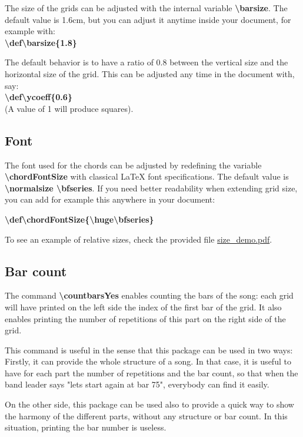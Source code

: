 \documentclass[11pt]{article}
\newcommand{\btt}{\bfseries \ttfamily }
\newcommand{\tbs}{\textbackslash{}}
\begin{document}
The size of the grids can be adjusted with the internal variable 
{\btt \tbs barsize}.
The default value is 1.6cm, but you can adjust it anytime inside your document, for example with:\\
{\btt \tbs def\tbs barsize\{1.8\}}

The default behavior is to have a ratio of 0.8 between the vertical size and the horizontal size of the grid.
This can be adjusted any time in the document with, say: \\
{\btt \tbs def\tbs ycoeff\{0.6\}} \\
(A value of 1 will produce squares).

\subsection{Font}

The font used for the chords can be adjusted by redefining the variable {\btt \tbs chordFontSize} with classical \LaTeX{} font specifications.
The default value is {\btt \tbs normalsize \tbs bfseries}.
If you need better readability when extending grid size, you can add for example this anywhere in your document:

{\btt \tbs def\tbs chordFontSize\{\tbs huge\tbs bfseries\}}

To see an example of relative sizes, check the provided file \href{https://github.com/skramm/chordbars/raw/master/size_demo.pdf}{size\_demo.pdf}.

\subsection{Bar count}

The command {\btt \tbs countbarsYes} enables counting the bars of the song:
each grid will have printed on the left side the index of the first bar of the grid.
It also enables printing the number of repetitions of this part on the right side of the grid.

This command is useful in the sense that this package can be used in two ways:
Firstly, it can provide the whole structure of a song.
In that case, it is useful to have for each part the number of repetitions and the bar count, so that when the band leader says "lets start again at bar 75", everybody can find it easily.

On the other side, this package can be used also to provide a quick way to show the harmony of the different parts, without any structure or bar count.
In this situation, printing the bar number is useless.
\end{document}
